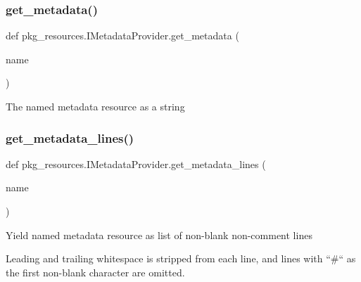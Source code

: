 \subsubsection{\texorpdfstring{get\+\_\+metadata()}{get\_metadata()}}
{\footnotesize\ttfamily def pkg\+\_\+resources.\+I\+Metadata\+Provider.\+get\+\_\+metadata (\begin{DoxyParamCaption}\item[{}]{name }\end{DoxyParamCaption})}

\begin{DoxyVerb}The named metadata resource as a string\end{DoxyVerb}
 \mbox{\label{classpkg__resources_1_1_i_metadata_provider_a54a382614fdde79c3dd5a0f1acfe6fe6}} 
\subsubsection{\texorpdfstring{get\+\_\+metadata\+\_\+lines()}{get\_metadata\_lines()}}
{\footnotesize\ttfamily def pkg\+\_\+resources.\+I\+Metadata\+Provider.\+get\+\_\+metadata\+\_\+lines (\begin{DoxyParamCaption}\item[{}]{name }\end{DoxyParamCaption})}

\begin{DoxyVerb}Yield named metadata resource as list of non-blank non-comment lines

       Leading and trailing whitespace is stripped from each line, and lines
       with ``#`` as the first non-blank character are omitted.\end{DoxyVerb}
 \mbox{\label{classpkg__resources_1_1_i_metadata_provider_a15fde1a73abacbfc3cadbcf48e046537}} 
